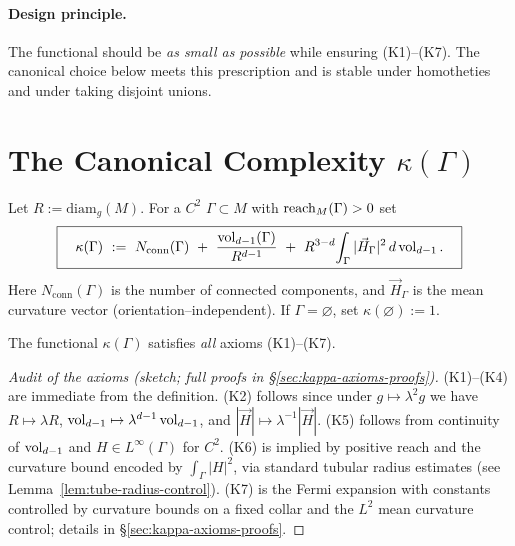 \paragraph{Design principle.} The functional should be \emph{as small as possible} while ensuring (K1)–(K7). The canonical choice below meets this prescription and is stable under homotheties and under taking disjoint unions.

\bigskip

\section{The Canonical Complexity \texorpdfstring{$\kappa(\Gamma)$}{kappa(Gamma)}}
\label{sec:canonical-kappa}

\begin{definition}
\label{def:canonical-kappa}
Let $R:=\mathrm{diam}_g(M)$. For a $C^2$ $\Gamma\subset M$ with $\operatorname{reach}_M(\Gamma)>0$ set
\[
\boxed{\quad
\kappa(\Gamma)\ :=\ N_{\mathrm{conn}}(\Gamma)\ +\ \frac{\vol_{d-1}(\Gamma)}{R^{d-1}}\ +\ R^{3-d}\!\int_\Gamma |\vec H_\Gamma|^2\,d\vol_{d-1}.
\quad}
\]
Here $N_{\mathrm{conn}}(\Gamma)$ is the number of connected components, and $\vec H_\Gamma$ is the mean curvature vector (orientation–independent). If $\Gamma=\varnothing$, set $\kappa(\varnothing):=1$.
\end{definition}

\begin{lemma}
\label{lem:kappa-axioms}
The functional $\kappa(\Gamma)$ satisfies \emph{all} axioms \textup{(K1)}–\textup{(K7)}.
\end{lemma}

\begin{proof}[Audit of the axioms (sketch; full proofs in \S\ref{sec:kappa-axioms-proofs})]
(K1)–(K4) are immediate from the definition. (K2) follows since under $g\mapsto \lambda^2 g$ we have $R\mapsto \lambda R$, $\operatorname{vol}_{d-1}\mapsto \lambda^{d-1}\operatorname{vol}_{d-1}$, and $|\vec H|\mapsto \lambda^{-1}|\vec H|$. (K5) follows from continuity of $\operatorname{vol}_{d-1}$ and $H\in L^\infty(\Gamma)$ for $C^2$. (K6) is implied by positive reach and the curvature bound encoded by $\int_\Gamma |H|^2$, via standard tubular radius estimates (see Lemma~\ref{lem:tube-radius-control}). (K7) is the Fermi expansion with constants controlled by curvature bounds on a fixed collar and the $L^2$ mean curvature control; details in \S\ref{sec:kappa-axioms-proofs}.
\end{proof}

